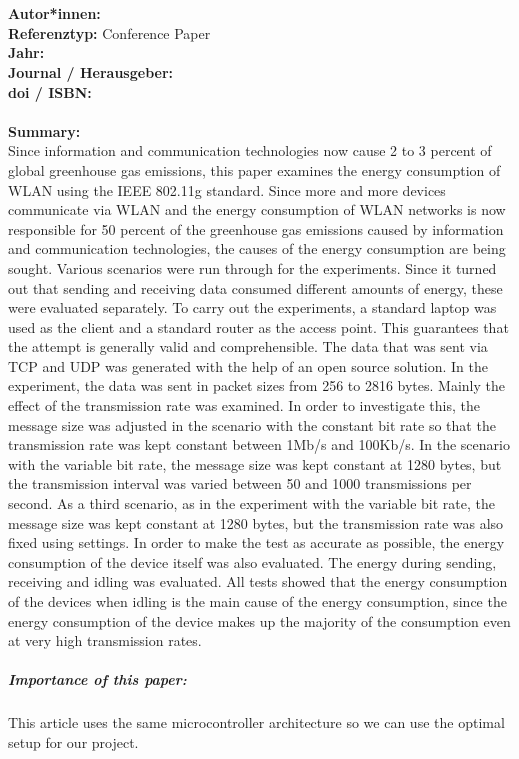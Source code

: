 \documentclass{report}
\newcommand{\createConferencePaperHeader}[1]{
    {\let\clearpage\relax \chapter{\citetitle{#1}}}
    \noindent
    \textbf{Autor*innen:} \citeauthor{#1} \\
    \textbf{Referenztyp:} Conference Paper\\
    \textbf{Jahr:} \citeyear{#1} \\
    \textbf{Journal / Herausgeber:} \citelist{#1}{publisher}\\
    \textbf{doi / ISBN:} \citefield{#1}{doi} \\\\
    \textbf{Summary:}\\
}
\begin{document}
\createConferencePaperHeader{gomez_analysing_2011}
Since information and communication technologies now cause 2 to 3 percent of global greenhouse gas emissions, this paper examines the energy consumption of WLAN using the IEEE 802.11g standard. Since more and more devices communicate via WLAN and the energy consumption of WLAN networks is now responsible for 50 percent of the greenhouse gas emissions caused by information and communication technologies, the causes of the energy consumption are being sought. Various scenarios were run through for the experiments. Since it turned out that sending and receiving data consumed different amounts of energy, these were evaluated separately.\linebreak
To carry out the experiments, a standard laptop was used as the client and a standard router as the access point. This guarantees that the attempt is generally valid and comprehensible. The data that was sent via TCP and UDP was generated with the help of an open source solution. In the experiment, the data was sent in packet sizes from 256 to 2816 bytes. Mainly the effect of the transmission rate was examined. In order to investigate this, the message size was adjusted in the scenario with the constant bit rate so that the transmission rate was kept constant between 1Mb/s and 100Kb/s. In the scenario with the variable bit rate, the message size was kept constant at 1280 bytes, but the transmission interval was varied between 50 and 1000 transmissions per second. As a third scenario, as in the experiment with the variable bit rate, the message size was kept constant at 1280 bytes, but the transmission rate was also fixed using settings. In order to make the test as accurate as possible, the energy consumption of the device itself was also evaluated. The energy during sending, receiving and idling was evaluated. All tests showed that the energy consumption of the devices when idling is the main cause of the energy consumption, since the energy consumption of the device makes up the majority of the consumption even at very high transmission rates.
\\
\paragraph{Importance of this paper:}
This article uses the same microcontroller architecture so we can use the optimal setup for our project.

\printbibliography
\end{document}
